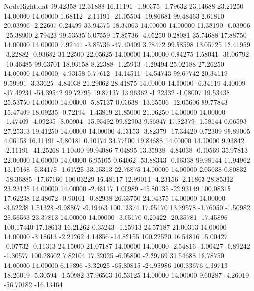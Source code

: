 \begin{filecontents}{NodeRight.dat}
  99.42358   12.31888   16.11191    -1.90375   -1.79632   23.14688   23.21250   14.00000   14.00000    1.68112   -2.11191  -21.05504  -19.86681
  99.48463    2.61810   20.03906    -2.22607    0.24499   33.94375   18.34063   14.00000   14.00000   11.38190   -6.03906  -25.38900    2.79423
  99.53535    6.07559   17.85736    -4.05250    0.28081   35.74688   17.88750   14.00000   14.00000    7.92441   -3.85736  -47.40409    3.28472
  99.58598   13.05725   12.41959    -3.22882   -0.93682   31.22500   22.05625   14.00000   14.00000    0.94275    1.58041  -36.06792  -10.46485
  99.63701   18.93158    8.22388    -1.25913   -1.29494   25.02188   27.26250   14.00000   14.00000   -4.93158    5.77612  -14.14511  -14.54743
  99.67742   20.34119    9.59991    -3.33625   -4.84038   21.29062   28.41875   14.00000   14.00000   -6.34119    4.40009  -37.49231  -54.39542
  99.72795   19.87137   13.96362    -1.22332   -1.08007   19.53438   25.53750   14.00000   14.00000   -5.87137    0.03638  -13.65506  -12.05606
  99.77843   15.47409   18.09235    -0.72194   -1.43819   21.85000   21.06250   14.00000   14.00000   -1.47409   -4.09235   -8.00904  -15.95492
  99.82903    9.86847   17.82379    -1.58144    0.06593   27.25313   19.41250   14.00000   14.00000    4.13153   -3.82379  -17.34420    0.72309
  99.89005    4.06158   16.11191    -3.80181    0.10174   34.77500   19.84688   14.00000   14.00000    9.93842   -2.11191  -41.25268    1.10400
  99.94086    7.04895   13.35938    -4.84038   -0.00569   35.97813   22.00000   14.00000   14.00000    6.95105    0.64062  -53.88343   -0.06338
  99.98144   11.94962   13.19168    -5.34175   -1.61725   33.15313   22.76875   14.00000   14.00000    2.05038    0.80832  -58.36885  -17.67160
 100.03229   16.48117   12.99011    -4.23156   -2.11863   28.85312   23.23125   14.00000   14.00000   -2.48117    1.00989  -45.80135  -22.93149
 100.08315   17.62238   12.48672    -0.90101   -0.82938   26.33750   24.04375   14.00000   14.00000   -3.62238    1.51328   -9.98867   -9.19463
 100.13374   17.05170   13.79578    -1.76050   -1.50982   25.56563   23.37813   14.00000   14.00000   -3.05170    0.20422  -20.35781  -17.45896
 100.17440   17.18613   16.21262     0.35243   -1.25913   24.57187   21.00313   14.00000   14.00000   -3.18613   -2.21262    4.14856  -14.82155
 100.22520   16.54816   15.00427    -0.07732   -0.11313   24.15000   21.07187   14.00000   14.00000   -2.54816   -1.00427   -0.89242   -1.30577
 100.28602    7.82104   17.32025    -6.05800   -2.29769   31.54688   18.78750   14.00000   14.00000    6.17896   -3.32025  -65.80815  -24.95986
 100.33676    4.39713   18.26019    -5.30594   -1.50982   37.96563   16.53125   14.00000   14.00000    9.60287   -4.26019  -56.70182  -16.13464

\end{filecontents}
